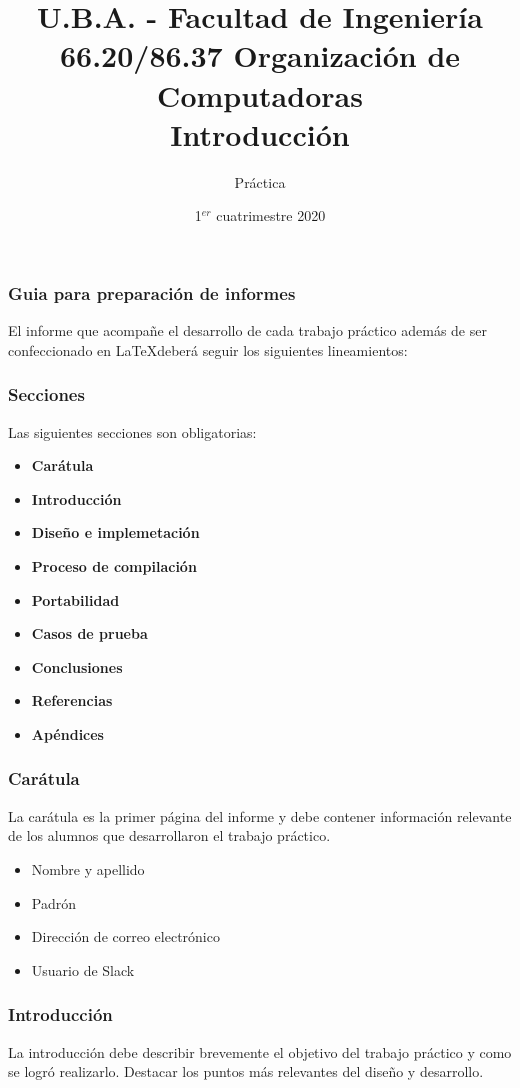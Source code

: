 \documentclass{beamer}
\title[66.20/86.37]{U.B.A. - Facultad de Ingeniería\\\vspace{0.25cm} 66.20/86.37 Organización de Computadoras
\\Introducción }
\author{Práctica}
\date{1$^{er}$ cuatrimestre 2020}
\begin{document}
\begin{frame}
\titlepage %
\end{frame}


\begin{frame}
\frametitle{Guia para preparación de informes}
El informe que acompañe el desarrollo de cada trabajo práctico además de ser confeccionado en \LaTeX deberá seguir los siguientes lineamientos:
\end{frame}

\begin{frame}
\frametitle{Secciones}
Las siguientes secciones son obligatorias:

\begin{multicols}{2}
\begin{itemize}
\item \textbf{Carátula}
\item \textbf{Introducción}
\item \textbf{Diseño e implemetación}
\item \textbf{Proceso de compilación}
\item \textbf{Portabilidad}
\item \textbf{Casos de prueba}
\item \textbf{Conclusiones}
\item \textbf{Referencias}
\item \textbf{Apéndices}
\end{itemize}
\end{multicols}
\end{frame}

\begin{frame}
\frametitle{Carátula}
La carátula es la primer página del informe y debe contener información relevante de los alumnos que desarrollaron el trabajo práctico.
\begin{itemize}
\item Nombre y apellido
\item Padrón
\item Dirección de correo electrónico
\item Usuario de Slack
\end{itemize}
\end{frame}

\begin{frame}
\frametitle{Introducción}
La introducción debe describir brevemente el objetivo del trabajo práctico y como se logró realizarlo. Destacar los puntos más relevantes del diseño y desarrollo.
\end{frame}
\end{document}
